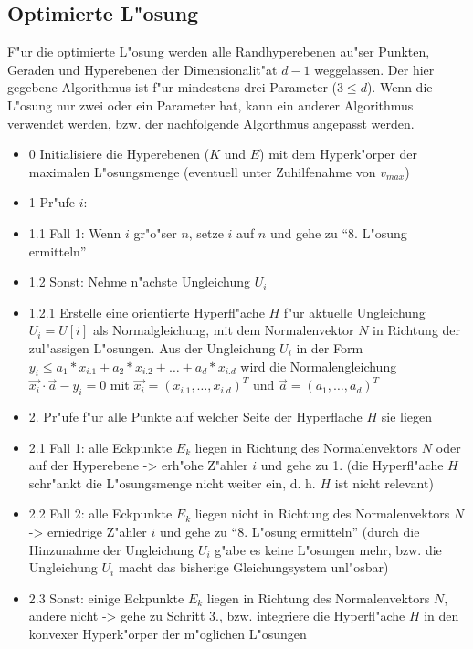 \subsection{Optimierte L"osung}


F"ur die optimierte L"osung werden alle Randhyperebenen au"ser Punkten, Geraden und Hyperebenen der Dimensionalit"at $d-1$ weggelassen. Der hier gegebene Algorithmus ist f"ur mindestens drei Parameter ($3 \leq d$). Wenn die L"osung nur zwei oder ein Parameter hat, kann ein anderer Algorithmus verwendet werden, bzw. der nachfolgende Algorthmus angepasst werden.

\begin{itemize}
 \item [] 0 Initialisiere die Hyperebenen ($K$ und $E$) mit dem Hyperk"orper der maximalen L"osungsmenge (eventuell unter Zuhilfenahme von $v_{max}$)
 \item [] 1 Pr"ufe $i$:
 \item [] 1.1 Fall 1: Wenn $i$ gr"o"ser $n$, setze $i$ auf $n$ und gehe zu ``8. L"osung ermitteln''
 \item [] 1.2 Sonst: Nehme n"achste Ungleichung $U_i$
 \item [] 1.2.1 Erstelle eine orientierte Hyperfl"ache $H$ f"ur aktuelle Ungleichung $U_i=U[i]$ als Normalgleichung, mit dem Normalenvektor $N$ in Richtung der zul"assigen L"osungen. Aus der Ungleichung $U_i$ in der Form $y_i \leq  a_1 * x_{i.1} + a_2 * x_{i.2} + \ldots + a_d * x_{i.d}$ wird die Normalengleichung $ \vec{x_i} \cdot \vec{a} - y_i = 0$ mit $\vec{x_i} = (x_{i.1}, \ldots, x_{i.d})^T$ und $\vec{a} = (a_{1}, \ldots, a_{d})^T$
 \item [] 2. Pr"ufe f"ur alle Punkte auf welcher Seite der Hyperflache $H$ sie liegen
 \item [] 2.1 Fall 1: alle Eckpunkte $E_k$  liegen in Richtung des Normalenvektors $N$ oder auf der Hyperebene -> erh"ohe Z"ahler $i$ und gehe zu 1. (die Hyperfl"ache $H$ schr"ankt die L"osungsmenge nicht weiter ein, d. h. $H$ ist nicht relevant)
 \item [] 2.2 Fall 2: alle Eckpunkte $E_k$ liegen nicht in Richtung des Normalenvektors $N$ -> erniedrige Z"ahler $i$ und gehe zu ``8. L"osung ermitteln'' (durch die Hinzunahme der Ungleichung $U_i$ g"abe es keine L"osungen mehr, bzw. die Ungleichung $U_i$ macht das bisherige Gleichungsystem unl"osbar)
 \item [] 2.3 Sonst: einige Eckpunkte $E_k$ liegen in Richtung des Normalenvektors $N$, andere nicht -> gehe zu Schritt 3., bzw. integriere die Hyperfl"ache $H$ in den konvexer Hyperk"orper der m"oglichen L"osungen

\end{itemize}
